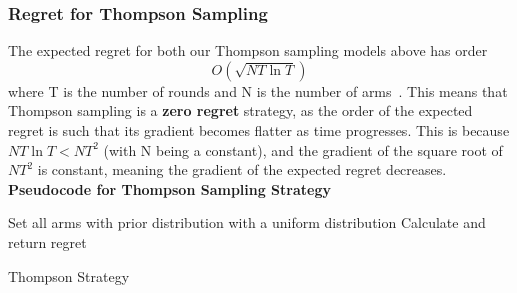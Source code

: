     \subsubsection{Regret for Thompson Sampling}
    The expected regret for both our Thompson sampling models above has order
    $$O(\sqrt{NT\ln{T}})$$
    where T is the number of rounds and N is the number of arms~\citep{agrawal2013further}. This means that Thompson sampling is a \textbf{zero regret} strategy, as the order of the expected regret is such that its gradient becomes flatter as time progresses. This is because $NT\ln{T} < NT^2$ (with N being a constant), and the gradient of the square root of $NT^2$ is constant, meaning the gradient of the expected regret decreases.
    \newline
    \textbf{Pseudocode for Thompson Sampling Strategy}
    \newline
    \begin{algorithm}[H]
        Set all arms with prior distribution with a uniform distribution\;
        Calculate and return regret
        \caption{Thompson Strategy}\label{alg:thompson_algorithm}
    \end{algorithm}